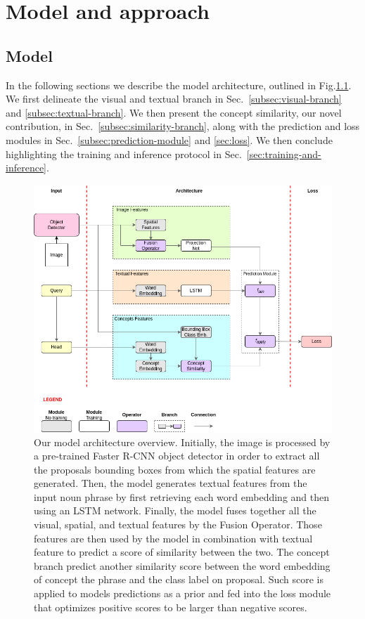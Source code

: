 
\chapter{Model and approach}
\label{ch:model}

\section{Model}

In the following sections we describe the model architecture, outlined
in Fig.\ref{fig:model-architecture}. We first delineate the visual and
textual branch in Sec.~\ref{subsec:visual-branch} and
\ref{subsec:textual-branch}. We then present the concept similarity,
our novel contribution, in Sec.~\ref{subsec:similarity-branch}, along
with the prediction and loss modules in
Sec.~\ref{subsec:prediction-module} and \ref{sec:loss}. We then
conclude highlighting the training and inference protocol in
Sec.~\ref{sec:training-and-inference}.

\begin{figure}
  \centering
  \includegraphics[width=1.0\textwidth]{figures/model-architecture.png}
  \caption[Model architecture overview]{ Our model architecture
    overview. Initially, the image is processed by a pre-trained
    Faster R-CNN object detector in order to extract all the proposals
    bounding boxes from which the spatial features are generated.
    Then, the model generates textual features from the input noun
    phrase by first retrieving each word embedding and then using an
    LSTM network. Finally, the model fuses together all the visual,
    spatial, and textual features by the Fusion Operator. Those
    features are then used by the model in combination with textual
    feature to predict a score of similarity between the two. The
    concept branch predict another similarity score between the word
    embedding of concept the phrase and the class label on proposal.
    Such score is applied to models predictions as a prior and fed
    into the loss module that optimizes positive scores to be larger
    than negative scores. }
  \label{fig:model-architecture}
\end{figure}

